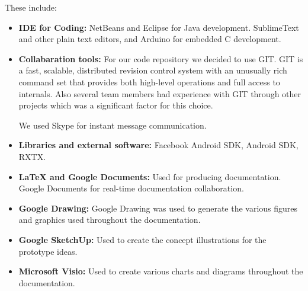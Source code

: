 These include:\newline
\begin{itemize}

	\item \textbf{IDE for Coding:} \newline
	NetBeans\cite{link:netbeans} and Eclipse\cite{link:eclipse} for Java development. SublimeText\cite{link:sublimetext} and other plain text editors, and Arduino\cite{link:arduinodev} for embedded C development.

	\item \textbf{Collabaration tools:} \newline
	For our code repository we decided to use GIT\cite{link:git}. GIT is a fast, scalable, distributed revision control system 
	with an unusually rich command set that provides both high-level operations and full access to internals. Also 
	several team members had experience with GIT through other projects which was a significant factor for 
	this choice.

	We used Skype\cite{link:skype} for instant message communication.

	\item \textbf{Libraries and external software:} \newline
	 Facebook Android SDK\cite{link:facebooksdk}, Android SDK\cite{link:androidsdk}, RXTX\cite{link:rxtx}.

	\item \textbf{\LaTeX{} and Google Documents:} \newline
	Used for producing documentation. Google Documents\cite{link:googledocs} for real-time documentation collaboration.

	\item \textbf{Google Drawing:} \newline
	Google Drawing\cite{link:googledocs} was used to generate the various figures and graphics used throughout the documentation.

	\item \textbf{Google SketchUp:} \newline
	Used to create the concept illustrations for the prototype ideas.\cite{link:googlesketchup}

	\item \textbf{Microsoft Visio:} \newline
	Used to create various charts and diagrams throughout the documentation.\cite{link:visio}

\end{itemize}

